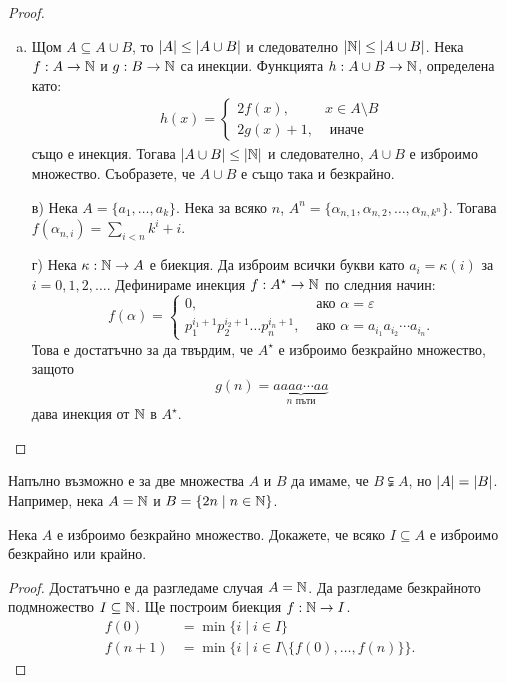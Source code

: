 \begin{proof}
  \begin{enumerate}[a)]
  \item
    Щом $A \subseteq A\cup B$, то $\lvert{A}\rvert \leq \lvert{A\cup B}\rvert$ и следователно
    $\lvert{\mathbb{N}}\rvert \leq \lvert{A\cup B}\rvert$.
    Нека $f:A\to \mathbb{N}$ и $g:B\to\mathbb{N}$ са инекции.
    Функцията $h:A\cup B\to \mathbb{N}$, определена като:
    \begin{align*}
      h(x) = 
      \begin{cases}
        2f(x), & x \in A\setminus B\\
        2g(x) + 1, & \mbox{ иначе}
      \end{cases}
    \end{align*}
    също е инекция.
    Тогава $\lvert{A\cup B}\rvert \leq \lvert{\mathbb{N}}\rvert$ и следователно, 
    $A\cup B$ е изброимо множество. 
    Съобразете, че $A\cup B$ е също така и безкрайно.
  \item[в)]
    Нека $A = \{a_1,\dots,a_k\}$.
    Нека за всяко $n$, $A^n = \{\alpha_{n,1},\alpha_{n,2},\dots, \alpha_{n,{k^n}}\}$.
    Тогава $f(\alpha_{n,i}) = \sum_{i<n} k^i + i$.
  \item[г)]
    Нека $\kappa:\mathbb{N} \to A$ е биекция.
    Да изброим всички букви като $a_i = \kappa(i)$ за $i = 0,1,2,\dots$.
    Дефинираме инекция $f:A^\star \to \mathbb{N}$ по следния начин:
    \[
    f(\alpha) = 
    \begin{cases}
      0,                             & \text{ ако } \alpha = \varepsilon\\
      p^{i_1+1}_1p^{i_2+1}_2\dots p^{i_n+1}_n, & \text{ ако } \alpha = a_{i_1}a_{i_2}\cdots a_{i_n}.
    \end{cases}
    \]
    Това е достатъчно за да твърдим, че $A^\star$ е изброимо безкрайно множество,
    защото \[g(n) = \underbrace{aaaa\cdots aa}_{n\text{ пъти}}\]
    дава инекция от $\mathbb{N}$ в $A^\star$.
  \end{enumerate}
\end{proof}

\begin{remark}
  Напълно възможно е за две множества $A$ и $B$ да имаме, че  $B \subsetneqq A$, но $\lvert{A}\rvert = \lvert{B}\rvert$.
  Например, нека $A = \mathbb{N}$ и $B = \{2n\mid n\in\mathbb{N}\}$.
\end{remark}

\begin{problem}
  Нека $A$ е изброимо безкрайно множество.
  Докажете, че всяко $I \subseteq A$ е изброимо безкрайно или крайно.
\end{problem}
\begin{proof}
  Достатъчно е да разгледаме случая $A = \mathbb{N}$.
  Да разгледаме безкрайното подмножество $I \subseteq \mathbb{N}$.
  Ще построим биекция $f:\mathbb{N} \to I$.
  \begin{align*}
    f(0)   & = \min\{i \mid i \in I\}\\
    f(n+1) &= \min\{i \mid i \in I \setminus\{f(0),\dots,f(n)\}\}.
\end{align*}
\end{proof}

